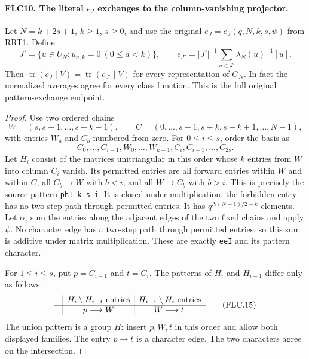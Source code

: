 \documentclass[11pt,a4paper]{article}
\numberwithin{equation}{section}
\theoremstyle{remark}\newtheorem{remark}[theorem]{Remark}
\begin{document}
\paragraph{FLC10. The literal $e_J$ exchanges to the column-vanishing projector.}
\label{claim:FLC10}
Let $N=k+2s+1$, $k\ge1$, $s\ge0$, and use the original
$e_J=e_J(q,N,k,s,\psi)$ from RRT1.  Define
\[
 J'=\{u\in U_N:u_{a,k}=0\ (0\le a<k)\},\qquad
 e_{J'}=|J'|^{-1}\sum_{u\in J'}\lambda_N(u)^{-1}[u].
\]
Then $\operatorname{tr}(e_J\mid V)
=\operatorname{tr}(e_{J'}\mid V)$ for every representation of
$G_N$.  In fact the normalized averages agree for every class
function.  This is the full original pattern-exchange endpoint.
\begin{proof}
Use two ordered chains
\[
 W=(s,s+1,\ldots,s+k-1),\qquad
 C=(0,\ldots,s-1,s+k,s+k+1,\ldots,N-1),
\]
with entries $W_a$ and $C_b$ numbered from zero.  For
$0\le i\le s$, order the basis as
\[
 C_0,\ldots,C_{i-1},W_0,\ldots,W_{k-1},C_i,C_{i+1},\ldots,C_{2s}.
\]
Let $H_i$ consist of the matrices unitriangular in this order
whose $k$ entries from $W$ into column $C_i$ vanish.
Its permitted entries are all forward entries within $W$ and
within $C$, all $C_b\to W$ with $b<i$, and all $W\to C_b$
with $b>i$.  This is precisely the source pattern
\texttt{ph\allowbreak I k s i}.  It is closed under multiplication: the
forbidden entry has no two-step path through permitted entries.
It has $q^{N(N-1)/2-k}$ elements.  Let $\alpha_i$ sum the
entries along the adjacent edges of the two fixed chains and
apply $\psi$.  No character edge has a two-step path through
permitted entries, so this sum is additive under matrix
multiplication.  These are exactly \texttt{ee\allowbreak I} and its
pattern character.

For $1\le i\le s$, put $p=C_{i-1}$ and $t=C_i$.
The patterns of $H_i$ and $H_{i-1}$ differ only as follows:
\[
 \begin{array}{c|c|c}
       &H_i\setminus H_{i-1}\text{ entries}
       &H_{i-1}\setminus H_i\text{ entries}\\ \hline
       &p\longrightarrow W&W\longrightarrow t.
 \end{array}
 \tag{FLC.15}
\]
The union pattern is a group $H$: insert $p,W,t$ in this
order and allow both displayed families.  The entry $p\to t$
is a character edge.  The two characters agree on the
intersection.


\end{proof}
\end{document}
